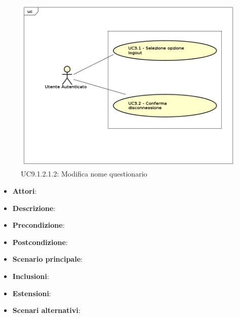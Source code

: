 					\label{UC9.1.2.1.2}
					\begin{figure}[h]
						\centering
					\includegraphics[scale=0.7,keepaspectratio]{UML/UC9.png}
						\caption{UC9.1.2.1.2: Modifica nome questionario}
					\end{figure}
					\FloatBarrier
					\begin{itemize}
						\item \textbf{Attori}: 
						\item \textbf{Descrizione}: 
						\item \textbf{Precondizione}: 
						\item \textbf{Postcondizione}: 
						\item \textbf{Scenario principale}:
						\item \textbf{Inclusioni}:
						\item \textbf{Estensioni}:
						\item \textbf{Scenari alternativi}:
					\end{itemize}
					
